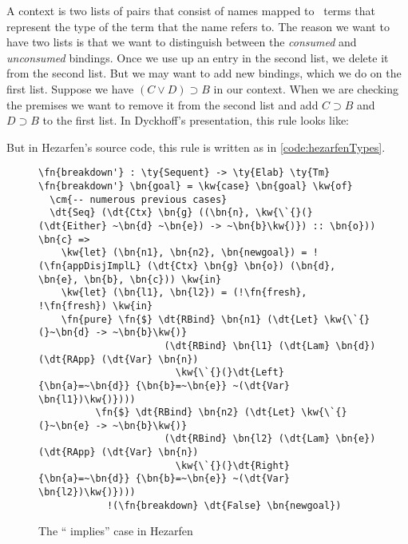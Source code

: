 A context is two lists of pairs that consist of names mapped to \Raw\ terms
that represent the type of the term that the name refers to.
The reason we want to have two lists is that we want to distinguish between the
\emph{consumed} and \emph{unconsumed} bindings. Once we use up an entry in the second list,
we delete it from the second list. But we may want to add new bindings, which
we do on the first list. Suppose we have $(C \vee D) \supset B$ in our context.
When we are checking the premises we want to remove it from the second list
and add $C \supset B$ and $D \supset B$ to the first list. In Dyckhoff's
presentation, this rule looks like:

\begin{prooftree}
\end{prooftree}
\vspace{\baselineskip}

But in Hezarfen's source code, this rule is written as in \autoref{code:hezarfenTypes}.

\begin{figure}[H]
\caption{The `` implies'' case in Hezarfen}
\label{code:hezarfenTypes}
\begin{Verbatim}[framesep=2mm, label=\footnotesize{\normalfont{Idris}}, labelposition=topline]
\fn{breakdown'} : \ty{Sequent} -> \ty{Elab} \ty{Tm}
\fn{breakdown'} \bn{goal} = \kw{case} \bn{goal} \kw{of}
  \cm{-- numerous previous cases}
  \dt{Seq} (\dt{Ctx} \bn{g} ((\bn{n}, \kw{\`{}(}(\dt{Either} ~\bn{d} ~\bn{e}) -> ~\bn{b}\kw{)}) :: \bn{o})) \bn{c} =>
    \kw{let} (\bn{n1}, \bn{n2}, \bn{newgoal}) = !(\fn{appDisjImplL} (\dt{Ctx} \bn{g} \bn{o}) (\bn{d}, \bn{e}, \bn{b}, \bn{c})) \kw{in}
    \kw{let} (\bn{l1}, \bn{l2}) = (!\fn{fresh}, !\fn{fresh}) \kw{in}
    \fn{pure} \fn{$} \dt{RBind} \bn{n1} (\dt{Let} \kw{\`{}(}~\bn{d} -> ~\bn{b}\kw{)}
                      (\dt{RBind} \bn{l1} (\dt{Lam} \bn{d}) (\dt{RApp} (\dt{Var} \bn{n})
                        \kw{\`{}(}\dt{Left} {\bn{a}=~\bn{d}} {\bn{b}=~\bn{e}} ~(\dt{Var} \bn{l1})\kw{)})))
          \fn{$} \dt{RBind} \bn{n2} (\dt{Let} \kw{\`{}(}~\bn{e} -> ~\bn{b}\kw{)}
                      (\dt{RBind} \bn{l2} (\dt{Lam} \bn{e}) (\dt{RApp} (\dt{Var} \bn{n})
                        \kw{\`{}(}\dt{Right} {\bn{a}=~\bn{d}} {\bn{b}=~\bn{e}} ~(\dt{Var} \bn{l2})\kw{)})))
            !(\fn{breakdown} \dt{False} \bn{newgoal})
\end{Verbatim}
\end{figure}

